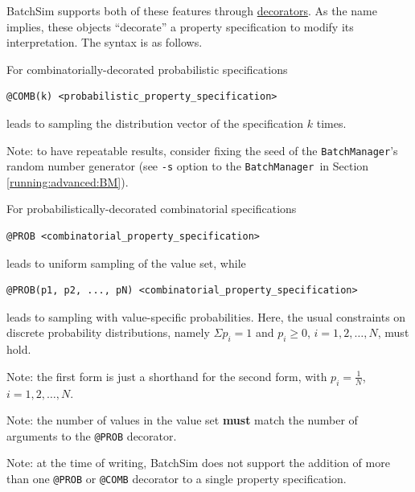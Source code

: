 \documentclass{article}
\newcommand{\BM}{{\tt BatchManager}}
\begin{document}
BatchSim supports both of these features through \href{https://en.wikipedia.org/wiki/Decorator_pattern}{decorators}. As the name implies, these objects ``decorate'' a property specification to modify its interpretation. The syntax is as follows.

For combinatorially-decorated probabilistic specifications

\begin{lstlisting}[]
  @COMB(k) <probabilistic_property_specification>
\end{lstlisting}

leads to sampling the distribution vector of the specification $k$ times.

\begin{sideblock}
Note: to have repeatable results, consider fixing the seed of the \BM's random number generator (see {\tt -s} option to the \BM\ in Section \ref{running:advanced:BM}).
\end{sideblock}

For probabilistically-decorated combinatorial specifications

\begin{lstlisting}[]
  @PROB <combinatorial_property_specification>
\end{lstlisting}

leads to uniform sampling of the value set, while

\begin{lstlisting}[]
  @PROB(p1, p2, ..., pN) <combinatorial_property_specification>
\end{lstlisting}

leads to sampling with value-specific probabilities. Here, the usual constraints on discrete probability distributions, namely $\Sigma{p_i} = 1$ and $p_i \geq 0$, $i = 1,2,\dots,N$, must hold.

\begin{sideblock}
Note: the first form is just a shorthand for the second form, with $p_i = \frac{1}{N}$, $i = 1,2,\dots,N$.
\end{sideblock}

\begin{sideblock}
Note: the number of values in the value set \textbf{must} match the number of arguments to the {\tt @PROB} decorator.
\end{sideblock}

\begin{sideblock}
Note: at the time of writing, BatchSim does not support the addition of more than one {\tt @PROB} or {\tt @COMB} decorator to a single property specification.
\end{sideblock}
\end{document}
